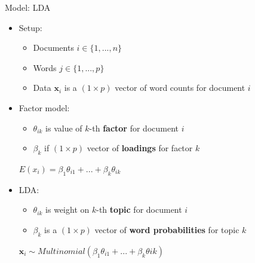 \documentclass[english]{beamer}
\begin{document}
\begin{frame}{Model: LDA}
\begin{itemize}
        \setlength{\itemsep}{0.6em}
    \item Setup:
    \vspace{4pt}
    \begin{itemize}
            \setlength{\itemsep}{0.3em}
        \item Documents $i \in \{1,..., n\}$
        \item Words $j \in \{1,..., p\}$
        \item Data $\textbf{x}_i$ is a $(1 \times p)$ vector of word counts for document $i$
    \end{itemize}
\pause
\item Factor model:
    \vspace{4pt}
    \begin{itemize}
            \setlength{\itemsep}{0.3em}
        \item $\theta_{ik}$ is value of $k$-th \textbf{factor} for document $i$
        \item $\beta_k$ if $(1 \times p)$ vector of \textbf{loadings} for factor $k$
    \end{itemize}
        \begin{center}
        $E(x_i) = \beta_1 \theta_{i1} + ... + \beta_k \theta_{ik}$
        \end{center}
        
        \vspace{-8pt}
        
\pause
\item LDA:
    \vspace{4pt}
    \begin{itemize}
            \setlength{\itemsep}{0.3em}
        \item $\theta_{ik}$ is weight on $k$-th \textbf{topic} for document $i$ 
        \item $\beta_k$ is a $(1 \times p) $ vector of \textbf{word probabilities} for topic $k$
    \end{itemize}
    \begin{center}
        $\textbf{x}_i \sim Multinomial (\beta_1 \theta_{i1} + ... + \beta_k \theta{ik})$
    \end{center}
\end{itemize}
\end{frame}
\end{document}
